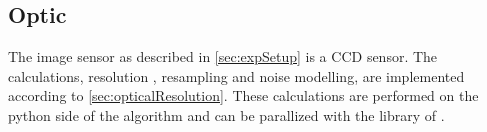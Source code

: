 \subsection{Optic}
\label{sec:ccdOptic}
%
The image sensor as described in \cref{sec:expSetup} is a \ac{CCD} sensor.
The calculations, \ie resolution \dummy{}, resampling and noise modelling, are implemented according to \cref{sec:opticalResolution}.
These calculations are performed on the python side of the algorithm and can be parallized with the  library of \python{}.
%
%
%
%
%
%
%
